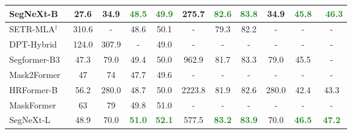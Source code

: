 \documentclass{article}
\begin{document}
\begin{table}[t]
\begin{center}
{\begin{tabular}{l|c|ccc|ccc|ccc}
     SegNeXt-B & 27.6 & 34.9 & \textbf{\textcolor{ForestGreen}{48.5}} & \textbf{\textcolor{ForestGreen}{49.9}} & 275.7 & \textbf{\textcolor{ForestGreen}{82.6}} & \textbf{\textcolor{ForestGreen}{83.8}} & 34.9 & \textbf{\textcolor{ForestGreen}{45.8}} & \
     \textbf{\textcolor{ForestGreen}{46.3}} \\  
\midrule
     SETR-MLA$^{\dagger}$\cite{zheng2021rethinking} & 310.6 & - & 48.6 & 50.1 & - & 79.3 & 82.2 & - & - & - \\  
     DPT-Hybrid~\cite{ranftl2021vision} & 124.0 & 307.9 & - & 49.0 & - & - & - & - & - & - \\
     Segformer-B3~\cite{xie2021segformer} & 47.3 & 79.0 & 49.4 & 50.0 & 962.9 & 81.7 & 83.3 & 79.0 & 45.5 & - \\  
Mask2Former~\cite{cheng2021mask2former} & 47 & 74 & 47.7 & 49.6 & - & - & - & - & - & - \\ 
     HRFormer-B~\cite{yuan2021hrformer} & 56.2 & 280.0 & 48.7 & 50.0 & 2223.8 & 81.9 & 82.6 & 280.0 & 42.4 & 43.3 \\ 
     MaskFormer~\cite{cheng2021maskformer} & 63 & 79 & 49.8 & 51.0 & - & - & - & -  & - & -  \\ 
     SegNeXt-L  & 48.9 & 70.0 & \textbf{\textcolor{ForestGreen}{51.0}} & \textbf{\textcolor{ForestGreen}{52.1}} & 577.5 & \textbf{\textcolor{ForestGreen}{83.2}} & \textbf{\textcolor{ForestGreen}{83.9}} & 70.0 & \textbf{\textcolor{ForestGreen}{46.5}} & \textbf{\textcolor{ForestGreen}{47.2}} \\  
\bottomrule
\end{tabular}
}
\label{tab:ade20k_city_stuff}
\end{center}
\vspace{-0.5cm}
\end{table}
\end{document}
